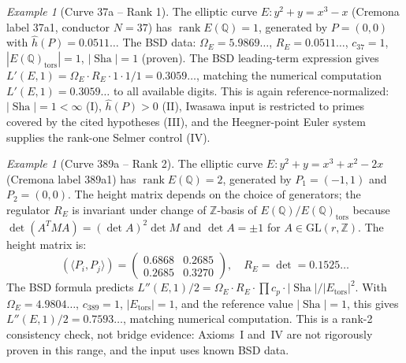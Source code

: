 \documentclass[aps,prd,twocolumn,superscriptaddress,nofootinbib,floatfix]{revtex4-2}
\theoremstyle{definition}
\theoremstyle{remark}
\newtheorem{example}[theorem]{Example}
\DeclareMathOperator{\rank}{rank}
\DeclareMathOperator{\Sha}{Sha}
\begin{document}
\begin{example}[Curve 37a -- Rank 1]
\label{ex:37a}
The elliptic curve $E: y^2 + y = x^3 - x$ (Cremona label 37a1, conductor $N = 37$) has $\rank E(\mathbb{Q}) = 1$, generated by $P = (0,0)$ with $\hat{h}(P) = 0.0511\ldots$ The BSD data: $\Omega_E = 5.9869\ldots$, $R_E = 0.0511\ldots$, $c_{37} = 1$, $|E(\mathbb{Q})_{\mathrm{tors}}| = 1$, $|\Sha| = 1$ (proven). The BSD leading-term expression gives $L'(E,1) = \Omega_E \cdot R_E \cdot 1 \cdot 1/1 = 0.3059\ldots$, matching the numerical computation $L'(E,1) = 0.3059\ldots$ to all available digits. This is again reference-normalized: $|\Sha| = 1 < \infty$ (I), $\hat{h}(P) > 0$ (II), Iwasawa input is restricted to primes covered by the cited hypotheses (III), and the Heegner-point Euler system supplies the rank-one Selmer control (IV).
\end{example}

\begin{example}[Curve 389a -- Rank 2]
\label{ex:389a}
The elliptic curve $E: y^2 + y = x^3 + x^2 - 2x$ (Cremona label 389a1) has $\rank E(\mathbb{Q}) = 2$, generated by $P_1 = (-1,1)$ and $P_2 = (0,0)$. The height matrix depends on the choice of generators; the regulator $R_E$ is invariant under change of $\mathbb{Z}$-basis of $E(\mathbb{Q})/E(\mathbb{Q})_{\mathrm{tors}}$ because $\det(A^T M A) = (\det A)^2 \det M$ and $\det A = \pm 1$ for $A \in \mathrm{GL}(r, \mathbb{Z})$. The height matrix is:
\[
\left(\langle P_i, P_j \rangle\right) = \begin{pmatrix} 0.6868 & 0.2685 \\ 0.2685 & 0.3270 \end{pmatrix}, \quad R_E = \det = 0.1525\ldots
\]
The BSD formula predicts $L''(E,1)/2 = \Omega_E \cdot R_E \cdot \prod c_p \cdot |\Sha|/|E_{\mathrm{tors}}|^2$. With $\Omega_E = 4.9804\ldots$, $c_{389} = 1$, $|E_{\mathrm{tors}}| = 1$, and the reference value $|\Sha| = 1$, this gives $L''(E,1)/2 = 0.7593\ldots$, matching numerical computation. This is a rank-2 consistency check, not bridge evidence: Axioms~I and~IV are not rigorously proven in this range, and the input uses known BSD data.
\end{example}
\end{document}
